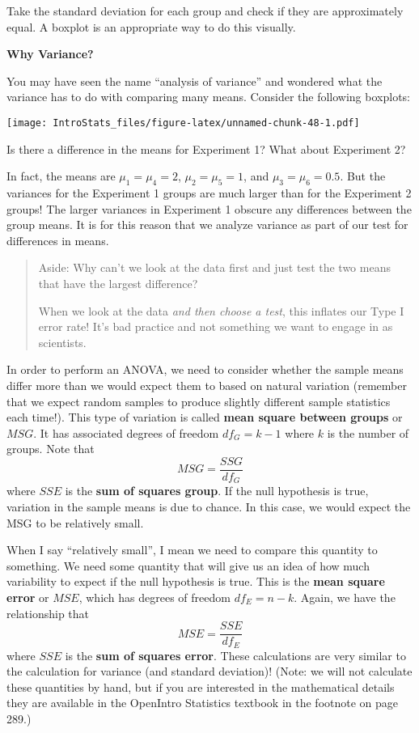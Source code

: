\documentclass[
]{book}
\begin{document}
Take the standard deviation for each group and check if they are approximately equal. A boxplot is an appropriate way to do this visually.

\textbf{Why Variance?}

You may have seen the name ``analysis of variance'' and wondered what the variance has to do with comparing many means. Consider the following boxplots:

\texttt{[image: IntroStats\_files/figure-latex/unnamed-chunk-48-1.pdf]}

Is there a difference in the means for Experiment 1? What about Experiment 2?

In fact, the means are \(\mu_1 = \mu_4 = 2\), \(\mu_2 = \mu_5 = 1\), and \(\mu_3 = \mu_6 = 0.5\). But the variances for the Experiment 1 groups are much larger than for the Experiment 2 groups! The larger variances in Experiment 1 obscure any differences between the group means. It is for this reason that we analyze variance as part of our test for differences in means.

\begin{quote}
Aside: Why can't we look at the data first and just test the two means that have the largest difference?

When we look at the data \emph{and then choose a test}, this inflates our Type I error rate! It's bad practice and not something we want to engage in as scientists.
\end{quote}

In order to perform an ANOVA, we need to consider whether the sample means differ more than we would expect them to based on natural variation (remember that we expect random samples to produce slightly different sample statistics each time!). This type of variation is called \textbf{mean square between groups} or \(MSG\). It has associated degrees of freedom \(df_G = k-1\) where \(k\) is the number of groups. Note that \[MSG = \frac{SSG}{df_G}\] where \(SSE\) is the \textbf{sum of squares group}. If the null hypothesis is true, variation in the sample means is due to chance. In this case, we would expect the MSG to be relatively small.

When I say ``relatively small'', I mean we need to compare this quantity to something. We need some quantity that will give us an idea of how much variability to expect if the null hypothesis is true. This is the \textbf{mean square error} or \(MSE\), which has degrees of freedom \(df_E = n-k\). Again, we have the relationship that \[MSE = \frac{SSE}{df_E}\] where \(SSE\) is the \textbf{sum of squares error}. These calculations are very similar to the calculation for variance (and standard deviation)! (Note: we will not calculate these quantities by hand, but if you are interested in the mathematical details they are available in the OpenIntro Statistics textbook in the footnote on page 289.)
\end{document}
